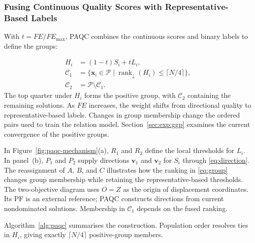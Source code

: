 \documentclass[final,5p,times,twocolumn]{elsarticle}
\newcommand{\vx}{\mathbf{x}}
\newcommand{\vv}{\mathbf{v}}
\begin{document}
\subsubsection{Fusing Continuous Quality Scores with Representative-Based Labels}
\label{sec:method:paqc:hybrid}

With $t=FE/FE_{\max}$, PAQC combines the
continuous scores and binary labels to define the groups:

\begin{equation}
\begin{aligned}
H_i&=(1-t)S_i+tL_i,\\
\mathcal{C}_1&=\bigl\{\vx_i\in\mathcal{P}\;\big|\;
  \operatorname{rank}_{\downarrow}(H_i)\leq\lceil N/4\rceil\bigr\},\\
\mathcal{C}_2&=\mathcal{P}\setminus\mathcal{C}_1 .
\end{aligned}
\label{eq:group}
\end{equation}
The top quarter under $H_i$ forms the positive group, with $\mathcal{C}_2$
containing the remaining solutions. As $FE$ increases, the weight shifts from
directional quality to representative-based labels. Changes in group membership
change the ordered pairs used to train the relation model.
Section~\ref{sec:exp:ggp} examines the current convergence of the positive groups.

In Figure~\ref{fig:paqc-mechanism}(a), $R_1$ and $R_2$ define the local
thresholds for $L_i$. In panel~(b), $P_1$ and $P_2$ supply directions
$\vv_1$ and $\vv_2$ for $S_i$ through \eqref{eq:direction}. The reassignment
of $A$, $B$, and $C$ illustrates how the ranking in \eqref{eq:group} changes
group membership while retaining the representative-based thresholds.
The two-objective diagram uses $O=Z$ as the origin of displacement coordinates. Its PF is an
external reference; PAQC constructs directions from current nondominated
solutions. Membership in $\mathcal{C}_1$ depends on the fused ranking.

Algorithm~\ref{alg:paqc} summarises the construction. Population order resolves
ties in $H_i$, giving exactly $\lceil N/4\rceil$ positive-group members.
\end{document}

